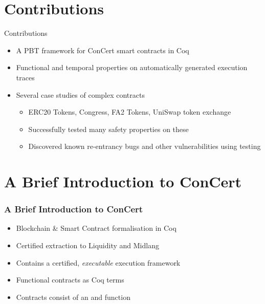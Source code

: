 
\section{Contributions}
\begin{frame}{Contributions}
\begin{itemize}
    \item A PBT framework for ConCert smart contracts in Coq
    \item Functional and temporal properties on automatically generated execution traces
    \item Several case studies of complex contracts
    \begin{itemize}
        \item ERC20 Tokens, Congress, FA2 Tokens, UniSwap token exchange
        \item Successfully tested many safety properties on these
        \item Discovered known re-entrancy bugs and other vulnerabilities using testing
    \end{itemize}
\end{itemize}
\end{frame}

\section{A Brief Introduction to ConCert}
\begin{frame}
\frametitle{A Brief Introduction to ConCert}
\begin{itemize}
    \item Blockchain \& Smart Contract formalisation in Coq
    \item Certified extraction to Liquidity and Midlang
    \item Contains a certified, \textit{executable} execution framework
    \item Functional contracts as Coq terms
    \item Contracts consist of an  and  function
\end{itemize}
\end{frame}

